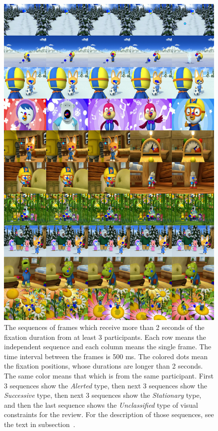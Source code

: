 \documentclass[10pt,letterpaper]{article}
\begin{document}
\begin{figure}
  \centerline{\includegraphics[width=120mm]{./eps/long_fixations_types.png}}
  \caption{The sequences of frames which receive more than 2 seconds of the fixation duration from at least 3 participants. Each row means the independent sequence and each column means the single frame. The time interval between the frames is 500 ms. The colored dots mean the fixation positions, whose durations are longer than 2 seconds. The same color means that which is from the same participant. First 3 sequences show the \textit{Alerted} type, then next 3 sequences show the \textit{Successive} type, then next 3 sequences show the \textit{Stationary} type, and then the last sequence shows the \textit{Unclassified} type of visual constraints for the review. For the description of those sequences, see the text in subsection~\textit{}.}
  \label{fig:long-fixations}
\end{figure}
\end{document}
